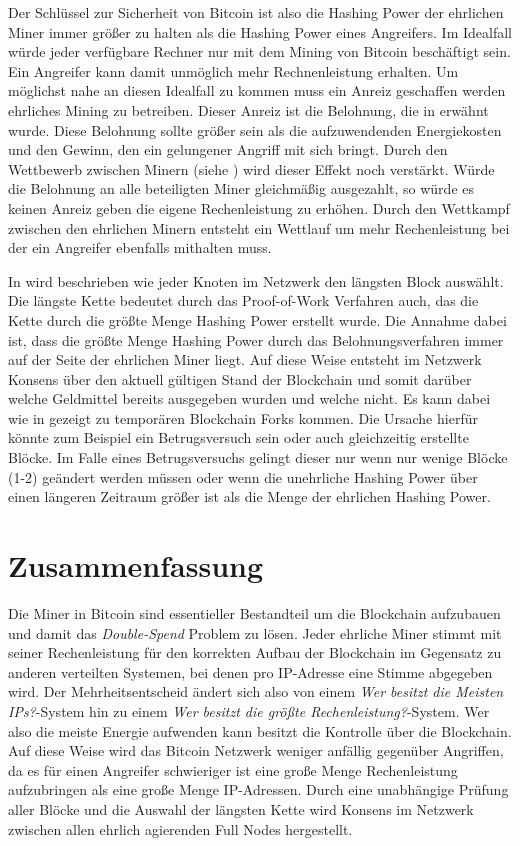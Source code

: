 \documentclass[ngerman,runningheads,a4paper]{llncs}[2018/03/10]
\begin{document}
Der Schlüssel zur Sicherheit von Bitcoin ist also die Hashing Power der ehrlichen Miner immer größer zu halten als die Hashing Power eines Angreifers. Im Idealfall würde jeder verfügbare Rechner nur mit dem Mining von Bitcoin beschäftigt sein. Ein Angreifer kann damit unmöglich mehr Rechnenleistung erhalten. Um möglichst nahe an diesen Idealfall zu kommen muss ein Anreiz geschaffen werden ehrliches Mining zu betreiben. Dieser Anreiz ist die Belohnung, die in  erwähnt wurde. Diese Belohnung sollte größer sein als die aufzuwendenden Energiekosten und den Gewinn, den ein gelungener Angriff mit sich bringt. Durch den Wettbewerb zwischen Minern (siehe ) wird dieser Effekt noch verstärkt. Würde die Belohnung an alle beteiligten Miner gleichmäßig ausgezahlt, so würde es keinen Anreiz geben die eigene Rechenleistung zu erhöhen. Durch den Wettkampf zwischen den ehrlichen Minern entsteht ein Wettlauf um mehr Rechenleistung bei der ein Angreifer ebenfalls mithalten muss.

In  wird beschrieben wie jeder Knoten im Netzwerk den längsten Block auswählt. Die längste Kette bedeutet durch das Proof-of-Work Verfahren auch, das die Kette durch die größte Menge Hashing Power erstellt wurde. Die Annahme dabei ist, dass die größte Menge Hashing Power durch das Belohnungsverfahren immer auf der Seite der ehrlichen Miner liegt. Auf diese Weise entsteht im Netzwerk Konsens über den aktuell gültigen Stand der Blockchain und somit darüber welche Geldmittel bereits ausgegeben wurden und welche nicht. Es kann dabei wie in  gezeigt zu temporären Blockchain Forks kommen. Die Ursache hierfür könnte zum Beispiel ein Betrugsversuch sein oder auch gleichzeitig erstellte Blöcke. Im Falle eines Betrugsversuchs gelingt dieser nur wenn nur wenige Blöcke (1-2) geändert werden müssen oder wenn die unehrliche Hashing Power über einen längeren Zeitraum größer ist als die Menge der ehrlichen Hashing Power.

\section{Zusammenfassung}\label{sec:Zusammenfassung}

Die Miner in Bitcoin sind essentieller Bestandteil um die Blockchain aufzubauen und damit das \textit{Double-Spend} Problem zu lösen. Jeder ehrliche Miner stimmt mit seiner Rechenleistung für den korrekten Aufbau der Blockchain im Gegensatz zu anderen verteilten Systemen, bei denen pro IP-Adresse eine Stimme abgegeben wird. Der Mehrheitsentscheid ändert sich also von einem \textit{Wer besitzt die Meisten IPs?}-System hin zu einem \textit{Wer besitzt die größte Rechenleistung?}-System. Wer also die meiste Energie aufwenden kann besitzt die Kontrolle über die Blockchain. Auf diese Weise wird das Bitcoin Netzwerk weniger anfällig gegenüber Angriffen, da es für einen Angreifer schwieriger ist eine große Menge Rechenleistung aufzubringen als eine große Menge IP-Adressen. Durch eine unabhängige Prüfung aller Blöcke und die Auswahl der längsten Kette wird Konsens im Netzwerk zwischen allen ehrlich agierenden Full Nodes hergestellt.
\end{document}
